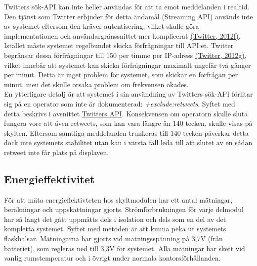 \documentclass[a4paper,11pt]{article}
\begin{document}
Twitters sök-API kan inte heller användas för att ta emot meddelanden i realtid. Den tjänst som Twitter erbjuder för detta ändamål (Streaming API) används inte av systemet eftersom den kräver autentisering, vilket skulle göra implementationen och användargränssnittet mer komplicerat \hyperref[twitter]{(Twitter, 2012f)}. Istället måste systemet regelbundet skicka förfrågningar till API:et. Twitter begränsar dessa förfrågningar till 150 per timme per IP-adress \hyperref[twitter]{(Twitter, 2012g)}, vilket innebär att systemet kan skicka förfrågningar maximalt ungefär två gånger per minut. Detta är inget problem för systemet, som skickar en förfrågan per minut, men det skulle orsaka problem om frekvensen ökades.\\

En ytterligare detalj är att systemet i sin användning av Twitters sök-API förlitar sig på en operator som inte är dokumenterad: {\it +exclude:retweets}. Syftet med detta beskrivs i avsnittet \hyperref[twitterapi]{Twitters API}. Konsekvensen om operatorn skulle sluta fungera vore att även retweets, som kan vara längre än 140 tecken, skulle visas på skylten. Eftersom samtliga meddelanden trunkeras till 140 tecken påverkar detta dock inte systemets stabilitet utan kan i värsta fall leda till att slutet av en sådan retweet inte får plats på displayen.\\

\subsection{Energieffektivitet}
För att mäta energieffektivteten hos skyltmodulen har ett antal mätningar, beräkningar och uppskattningar gjorts. Strömförbrukningen för varje delmodul har så långt det gått uppmätts dels i isolation och dels som en del av det kompletta systemet. Syftet med metoden är att kunna peka ut systemets flaskhalsar. Mätningarna har gjorts vid matningsspänning på 3,7V (från batteriet), som regleras ned till 3,3V för systemet. Alla mätningar har skett vid vanlig rumstemperatur och i övrigt under normala kontorsförhållanden.\\
\end{document}
